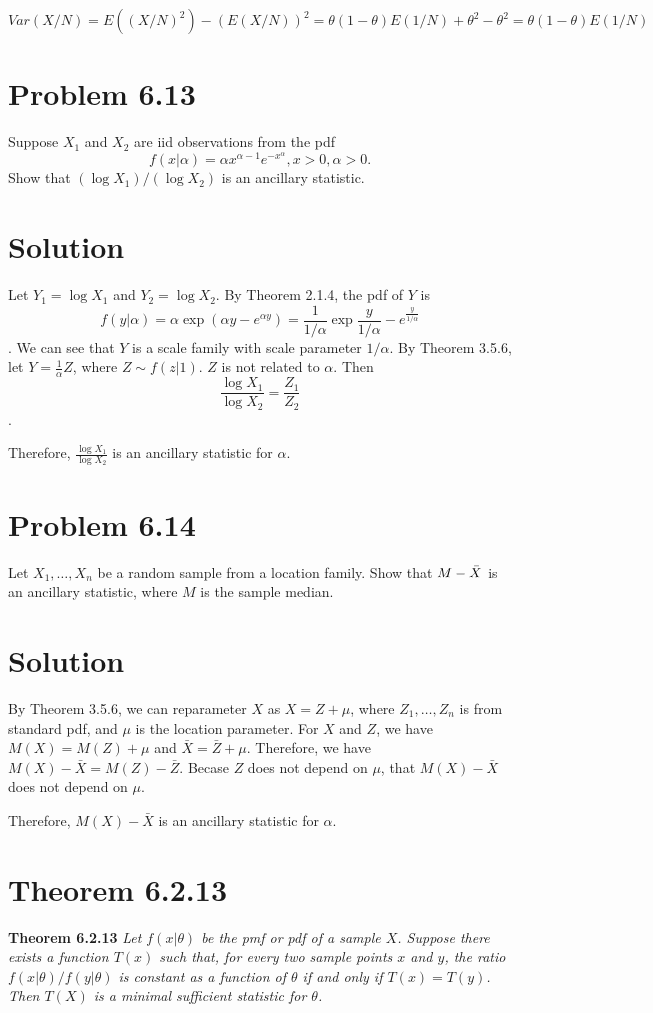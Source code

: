 \documentclass{article} %
\newcommand{\sample}[1]{#1_1 , \dots , #1_n}
\newcommand{\solution}[1]{\section*{Solution #1}}
\begin{document}
$$Var(X/N) = E((X/N)^2) - (E(X/N))^2 = \theta(1-\theta)E(1/N) + \theta^2 - \theta^2 = \theta(1-\theta)E(1/N)$$

\section*{Problem 6.13}
Suppose $X_1$ and $X_2$ are iid observations from the pdf 
$$f(x|\alpha) = \alpha x^{\alpha-1}e^{-x^\alpha}, x > 0, \alpha > 0.$$
Show that $(\log X_1 ) / (\log X_2)$ is an ancillary statistic. \\

\solution{}
Let $Y_1 = \log X_1$ and $Y_2 = \log X_2$. By Theorem 2.1.4, the pdf of $Y$ is
$$f(y|\alpha) = \alpha \exp (\alpha y - e^{\alpha y}) = \frac{1}{1/\alpha} \exp {\frac{y}{1/\alpha} - e^{\frac{y}{1/\alpha}}}$$.
We can see that $Y$ is a scale family with scale parameter $1/\alpha$. By Theorem 3.5.6, let $Y = \frac{1}{\alpha}Z$, where $Z \sim f(z|1)$. $Z$ is not related to $\alpha$.
Then
$$\frac{\log X_1}{\log X_2} = \frac{Z_1}{Z_2}$$.

Therefore, $\frac{\log X_1}{\log X_2}$ is an ancillary statistic for $\alpha$.

\section*{Problem 6.14}
Let $\sample{X}$ be a random sample from a location family. Show that $M - \Bar{X}$ is an
ancillary statistic, where $M$ is the sample median. \\

\solution{}
By Theorem 3.5.6, we can reparameter $X$ as $X = Z + \mu$, where $\sample{Z}$ is from standard pdf, and $\mu$ is the location parameter. For $X$ and $Z$, we have $M(X) = M(Z) + \mu$ and $\bar X = \bar Z + \mu$. Therefore, we have $M(X) - \bar X = M(Z) - \bar Z$.
Becase $Z$ does not depend on $\mu$, that $M(X) - \bar X$ does not depend on $\mu$.

Therefore, $M(X) - \bar X$ is an ancillary statistic for $\alpha$.

\section*{Theorem 6.2.13}			
\textbf{Theorem 6.2.13} \textit{Let $f(x|\theta)$ be the pmf or pdf of a sample $X$. Suppose there exists a function $T(x)$ such that, for every two sample points $x$ and $y$, the ratio $f(x|\theta)/ f(y|\theta)$ is constant as a function of $\theta$ if and only if $T(x) = T(y)$. Then $T(X)$ is a minimal sufficient statistic for $\theta$.} \\
\end{document}
